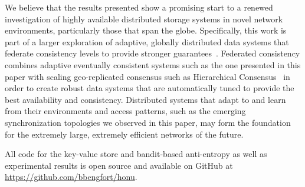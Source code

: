 We believe that the results presented show a promising start to a renewed
investigation of highly available distributed storage systems in novel
network environments, particularly those that span the globe.
Specifically, this work is part of a larger exploration of adaptive,
globally distributed data systems that federate consistency levels to provide
stronger guarantees~\cite{federated_consistency_poster}.
Federated consistency combines adaptive eventually consistent systems such as
the one presented in this paper with scaling geo-replicated consensus such as
Hierarchical Consensus~\cite{hc_brief_announcement} in order to create robust
data systems that are automatically tuned to provide the best availability
and consistency.
Distributed systems that adapt to and learn from their environments and
access patterns, such as the emerging synchronization topologies we observed
in this paper, may form the foundation for the extremely large, extremely
efficient networks of the future.

All code for the key-value store and bandit-based anti-entropy as well as
experimental results is open source and available on GitHub at
\url{https://github.com/bbengfort/honu}.
